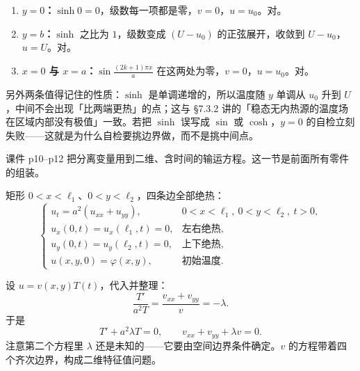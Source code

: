 
\begin{enumerate}[label=(\arabic*)]
  \item \textbf{$y=0$：}$\sinh 0=0$，级数每一项都是零，$v=0$，$u=u_0$。对。
  \item \textbf{$y=b$：}$\sinh$ 之比为 $1$，级数变成 $(U-u_0)$ 的正弦展开，收敛到 $U-u_0$，$u=U$。对。
  \item \textbf{$x=0$ 与 $x=a$：}$\sin\frac{(2k+1)\pi x}{a}$ 在这两处为零，$v=0$，$u=u_0$。对。
\end{enumerate}

另外两条值得记住的性质：$\sinh$ 是单调递增的，所以温度随 $y$ 单调从 $u_0$ 升到 $U$，中间不会出现「比两端更热」的点；这与 \S7.3.2 讲的「稳态无内热源的温度场在区域内部没有极值」一致。若把 $\sinh$ 误写成 $\sin$ 或 $\cosh$，$y=0$ 的自检立刻失败——这就是为什么自检要挑边界做，而不是挑中间点。





课件 p10--p12 把分离变量用到二维、含时间的输运方程。这一节是前面所有零件的组装。


矩形 $0<x<\ell_1$、$0<y<\ell_2$，四条边全部绝热：
\begin{equation}
  \begin{cases}
    u_t=a^2(u_{xx}+u_{yy}), & 0<x<\ell_1,\ 0<y<\ell_2,\ t>0,\\
    u_x(0,t)=u_x(\ell_1,t)=0, & \text{左右绝热},\\
    u_y(0,t)=u_y(\ell_2,t)=0, & \text{上下绝热},\\
    u(x,y,0)=\varphi(x,y), & \text{初始温度}.
  \end{cases}
\end{equation}


设 $u=v(x,y)T(t)$，代入并整理：
\begin{equation}
  \frac{T'}{a^2T}=\frac{v_{xx}+v_{yy}}{v}=-\lambda .
\end{equation}
于是
\begin{equation}
  T'+a^2\lambda T=0,\qquad v_{xx}+v_{yy}+\lambda v=0 .
\end{equation}
注意第二个方程里 $\lambda$ 还是未知的——它要由空间边界条件确定。$v$ 的方程带着四个齐次边界，构成二维特征值问题。

